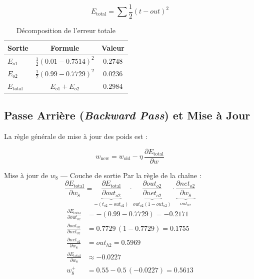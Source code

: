 \documentclass[12pt, a4paper]{article}
\begin{document}
\begin{mathbox}
\begin{equation}
    E_{\text{total}} = \sum \frac{1}{2}(t - out)^2
    \label{eq:mse}
\end{equation}
\end{mathbox}

\begin{table}[H]
    \centering
    \caption{Décomposition de l'erreur totale}
    \label{tab:erreur}
    \renewcommand{\arraystretch}{1.4}
    \begin{tabular}{lcc}
        \toprule
        \rowcolor{espblue!15}
        \textbf{Sortie} & \textbf{Formule} & \textbf{Valeur} \\
        \midrule
        $E_{o1}$ & $\frac{1}{2}(0.01 - 0.7514)^2$ & $0.2748$ \\
        $E_{o2}$ & $\frac{1}{2}(0.99 - 0.7729)^2$ & $0.0236$ \\
        \midrule
        \rowcolor{codegreen!15}
        $E_{\text{total}}$ & $E_{o1} + E_{o2}$ & $\mathbf{0.2984}$ \\
        \bottomrule
    \end{tabular}
\end{table}

\subsection{Passe Arrière (\textit{Backward Pass}) et Mise à Jour}

La règle générale de mise à jour des poids est :

\begin{mathbox}
\begin{equation}
    w_{\text{new}} = w_{\text{old}} - \eta\,\frac{\partial E_{\text{total}}}{\partial w}
    \label{eq:update}
\end{equation}
\end{mathbox}

\begin{stepbox}{Mise à jour de $w_8$ — Couche de sortie}
Par la règle de la chaîne :
\[
    \frac{\partial E_{\text{total}}}{\partial w_8}
    = \underbrace{\frac{\partial E_{\text{total}}}{\partial out_{o2}}}_{-(t_{o2}-out_{o2})}
    \cdot \underbrace{\frac{\partial out_{o2}}{\partial net_{o2}}}_{out_{o2}(1-out_{o2})}
    \cdot \underbrace{\frac{\partial net_{o2}}{\partial w_8}}_{out_{h2}}
\]
\begin{align*}
    \frac{\partial E_{\text{total}}}{\partial out_{o2}}
        &= -(0.99 - 0.7729) = -0.2171 \\
    \frac{\partial out_{o2}}{\partial net_{o2}}
        &= 0.7729\,(1 - 0.7729) = 0.1755 \\
    \frac{\partial net_{o2}}{\partial w_8}
        &= out_{h2} = 0.5969 \\[4pt]
    \frac{\partial E_{\text{total}}}{\partial w_8}
        &\approx -0.0227 \\[4pt]
    w_8^{+} &= 0.55 - 0.5\,(-0.0227) = \mathbf{0.5613}
\end{align*}
\end{stepbox}
\end{document}
